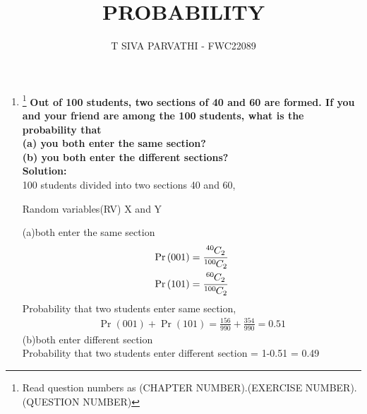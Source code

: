 \documentclass{article}
\providecommand{\pr}[1]{\ensuremath{\Pr\left(#1\right)}}
\newcommand{\solution}{\noindent \textbf{Solution: }}
\newcommand*{\permcomb}[4][0mu]{{{}^{#3}\mkern#1#2_{#4}}}
\newcommand*{\comb}[1][-1mu]{\permcomb[#1]{C}}
\begin{document}
\title{PROBABILITY}
\author{\Large T SIVA PARVATHI - FWC22089}
\date{}

\maketitle
\begin{enumerate}[label=16.\arabic{enumi}.\arabic{enumii}]%
\setcounter{enumi}{3}
\setcounter{enumii}{5}

\item \footnote{Read question numbers as (CHAPTER NUMBER).(EXERCISE NUMBER).(QUESTION NUMBER)}
\textbf {Out of 100 students, two sections of 40 and 60 are formed. If you and your friend are among the 100 students, what is the probability that\\
(a) you both enter the same section?\\
(b) you both enter the different sections?}\\[1ex]

\solution\\
100 students divided into two sections 40 and 60,
\begin{table}[h]
	
	 \caption{Random variables(RV) X and Y}\label{table:1}
\end{table}

(a)both enter the same section\\
\begin{align}
\pr{001} = \frac{\comb{40}{2}} {\comb{100}{2}}\\
\pr{101} = \frac{\comb{60}{2}} {\comb{100}{2}}
\end{align}
Probability that two students enter same section,\\
\begin{align}
\pr{001}+\pr{101} = \frac{156}{990}+\frac{354}{990} = 0.51
\end{align}
(b)both enter different section\\
Probability that two students enter different section = 1-0.51 = 0.49
\end{enumerate}
\end{document}
